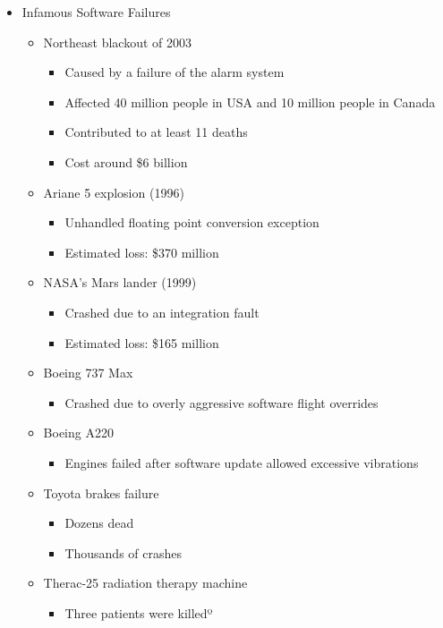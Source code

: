 \documentclass[11pt]{article}
\begin{document}
\begin{itemize}
	\item Infamous Software Failures
		\begin{itemize}
			\item Northeast blackout of 2003
				\begin{itemize}
					\item Caused by a failure of the alarm system
					\item Affected 40 million people in USA and 10 million people in Canada
					\item Contributed to at least 11 deaths
					\item Cost around \$6 billion
				\end{itemize}
			\item Ariane 5 explosion (1996)
				\begin{itemize}
					\item Unhandled floating point conversion exception
					\item Estimated loss: \$370 million
				\end{itemize}
			\item NASA’s Mars lander (1999)
				\begin{itemize}
					\item Crashed due to an integration fault
					\item Estimated loss: \$165 million
				\end{itemize}
			\item Boeing 737 Max
				\begin{itemize}
					\item Crashed due to overly aggressive software flight overrides
				\end{itemize}
			\item Boeing A220
				\begin{itemize}
					\item Engines failed after software update allowed excessive vibrations
				\end{itemize}
			\item Toyota brakes failure
				\begin{itemize}
					\item Dozens dead
					\item Thousands of crashes
				\end{itemize}
			\item Therac-25 radiation therapy machine
				\begin{itemize}
					\item Three patients were killedº
				\end{itemize}
		\end{itemize}


\end{itemize}
\end{document}
